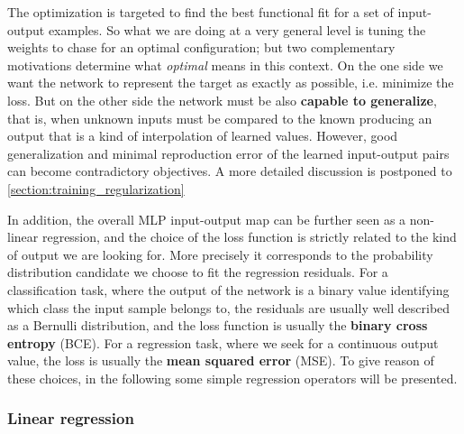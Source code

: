 The optimization is targeted to find the best functional fit for a set of input-output examples. So what we are doing at a very general level is tuning the weights to chase for an optimal configuration; but two complementary motivations determine what \textit{optimal} means in this context. On the one side we want the network to represent the target as exactly as possible, i.e. minimize the loss. But on the other side the network must be also \textbf{capable to generalize}, that is, when unknown inputs must be compared to the known producing an output that is a kind of interpolation of learned values. However, good generalization and minimal reproduction error of the learned input-output pairs can become contradictory objectives.
A more detailed discussion is postponed to \cref{section:training_regularization}

In addition, the overall \acs{MLP} input-output map can be further seen as a non-linear regression, and the choice of the loss function is strictly related to the kind of output we are looking for. More precisely it corresponds to the probability distribution candidate we choose to fit the regression residuals. For a classification task, where the output of the network is a binary value identifying which class the input sample belongs to, the residuals are usually well described as a Bernulli distribution, and the loss function is usually the \textbf{binary cross entropy} (BCE). For a regression task, where we seek for a continuous output value, the loss is usually the \textbf{mean squared error} (MSE).
%
To give reason of these choices, in the following some simple regression operators will be presented.

\subsubsection{Linear regression}


